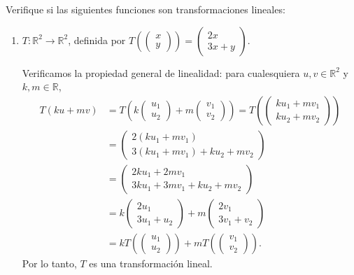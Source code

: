 \begin{example}
Verifique si las siguientes funciones son transformaciones lineales:

\begin{enumerate}
    \item $T:\mathbb{R}^2 \to \mathbb{R}^2$, definida por $T\left(\begin{pmatrix}x\\y\end{pmatrix}\right)= \begin{pmatrix}2x\\3x+y\end{pmatrix}$.

    \begin{myproof}
    Verificamos la propiedad general de linealidad: para cualesquiera $u, v \in \mathbb{R}^2$ y $k, m \in \mathbb{R}$,
    \begin{align*}
        T(ku + mv) &= T\left(k\begin{pmatrix}u_1\\u_2\end{pmatrix} + m\begin{pmatrix}v_1\\v_2\end{pmatrix}\right) = T\left(\begin{pmatrix}ku_1 + mv_1 \\ ku_2 + mv_2\end{pmatrix}\right) \\
        &= \begin{pmatrix}2(ku_1 + mv_1) \\ 3(ku_1 + mv_1) + ku_2 + mv_2\end{pmatrix} \\
        &= \begin{pmatrix}2ku_1 + 2mv_1 \\ 3ku_1 + 3mv_1 + ku_2 + mv_2\end{pmatrix} \\
        &= k\begin{pmatrix}2u_1 \\ 3u_1 + u_2\end{pmatrix} + m\begin{pmatrix}2v_1 \\ 3v_1 + v_2\end{pmatrix} \\
        &= kT\left(\begin{pmatrix}u_1\\u_2\end{pmatrix}\right) + mT\left(\begin{pmatrix}v_1\\v_2\end{pmatrix}\right).
    \end{align*}
    Por lo tanto, $T$ es una transformación lineal. \qedhere
    \end{myproof}


\end{enumerate}
\end{example}
